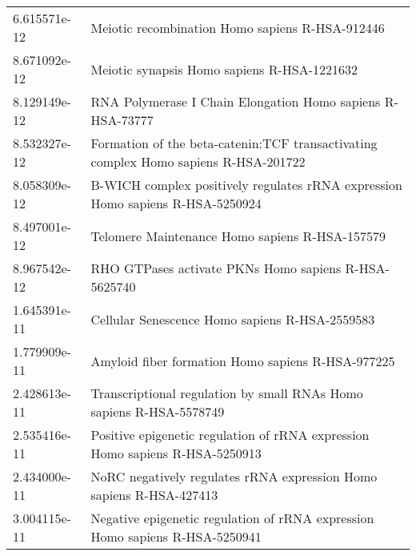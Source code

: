 \begin{longtable}{p{2.4cm}p{14.5cm}}
             6.615571e-12 &                                                                                       Meiotic recombination Homo sapiens R-HSA-912446 \\
             8.671092e-12 &                                                                                           Meiotic synapsis Homo sapiens R-HSA-1221632 \\
             8.129149e-12 &                                                                            RNA Polymerase I Chain Elongation Homo sapiens R-HSA-73777 \\
             8.532327e-12 &                                                   Formation of the beta-catenin:TCF transactivating complex Homo sapiens R-HSA-201722 \\
             8.058309e-12 &                                                        B-WICH complex positively regulates rRNA expression Homo sapiens R-HSA-5250924 \\
             8.497001e-12 &                                                                                        Telomere Maintenance Homo sapiens R-HSA-157579 \\
             8.967542e-12 &                                                                                  RHO GTPases activate PKNs Homo sapiens R-HSA-5625740 \\
             1.645391e-11 &                                                                                        Cellular Senescence Homo sapiens R-HSA-2559583 \\
             1.779909e-11 &                                                                                     Amyloid fiber formation Homo sapiens R-HSA-977225 \\
             2.428613e-11 &                                                                   Transcriptional regulation by small RNAs Homo sapiens R-HSA-5578749 \\
             2.535416e-11 &                                                          Positive epigenetic regulation of rRNA expression Homo sapiens R-HSA-5250913 \\
             2.434000e-11 &                                                                   NoRC negatively regulates rRNA expression Homo sapiens R-HSA-427413 \\
             3.004115e-11 &                                                          Negative epigenetic regulation of rRNA expression Homo sapiens R-HSA-5250941 \\

\end{longtable}

